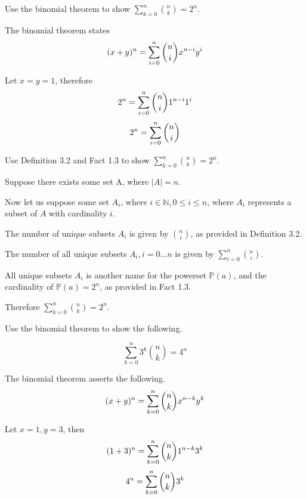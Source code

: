 \documentclass[openany, 12pt]{book}
\begin{document}
\begin{exercise}{}{}
	Use the binomial theorem to show $\sum\limits_{k=0}^n\binom{n}{k}=2^n$.
	\begin{alist}
		\item The binomial theorem states
		$$(x+y)^n=\sum\limits_{i=0}^n\dbinom{n}{i}x^{n-i}y^i$$
		\item Let $x=y=1$, therefore
		$$2^n=\sum\limits_{i=0}^n\dbinom{n}{i}1^{n-i}1^i$$
		$$2^n=\sum\limits_{i=0}^n\dbinom{n}{i}$$
	\end{alist}
\end{exercise}

\begin{exercise}{}{}
	Use Definition 3.2 and Fact 1.3 to show $\sum\limits_{k=0}^n\binom{n}{k}=2^n$.
	\begin{alist}
		\item Suppose there exists some set A, where $|A|=n$.
		\item Now let us suppose some set $A_i$, where $i\in \mathbb{N}, 0\leq i
			\leq n$, where $A_i$ represents a subset of $A$ with cardinality $i$.
		\item The number of unique subsets $A_i$ is given by $\binom{n}{i}$, as
		provided in Definition 3.2.
		\item The number of all unique subsets $A_i, i=0\ldots n$ is given by
		$\sum\limits_{i=0}^n\binom{n}{i}$.
		\item All unique subsets $A_i$ is another name for the powerset $\mathbb{P}(a)$,
		and the cardinality of $\mathbb{P}(a)=2^n$, as provided in Fact 1.3.
		\item Therefore $\sum\limits_{k=0}^n\binom{n}{k}=2^n$.
	\end{alist}
\end{exercise}

\begin{exercise}{}{}
	Use the binomial theorem to show the following.
	\begin{alist}
		\item
		$$\sum\limits_{k=0}^n 3^k \binom{n}{k}=4^n$$
		\item
		The binomial theorem asserts the following.
		$$
			(x+y)^n = \sum\limits_{k=0}^n \dbinom{n}{k} x^{n-k}y^k
		$$
		\item Let $x=1, y=3$, then
		$$
			(1+3)^n = \sum\limits_{k=0}^n \dbinom{n}{k} 1^{n-k}3^k
		$$
		$$
			4^n = \sum\limits_{k=0}^n \dbinom{n}{k} 3^k
		$$
	\end{alist}
\end{exercise}
\end{document}
